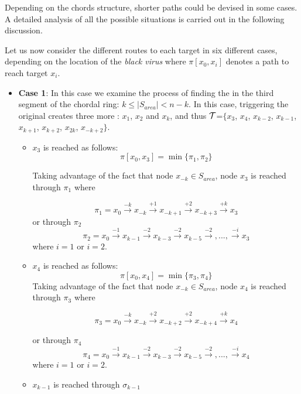  \noindent Depending on the chords structure,  shorter paths could be devised in some cases. A detailed analysis of all the possible situations is carried out in the following discussion.

Let us now consider the different routes to each target in six different cases, depending on the location of the {\it black virus} where $\pi[x_0,x_{i}] $ denotes a path to reach target $x_i$.
\begin{itemize}
\item {\bf Case 1}: In this case we examine the process of  finding the \bv in the third segment of the chordal ring: $k\leq |S_{area}| <n-k$. In this case, triggering the original \bv creates three more \bvs: $x_{1}$, $x_{2}$ and $x_{k}$, and thus $\cal T$=$\{ x_{3}$,  $x_{4}$, $x_{k-2}$, $x_{k-1}$, $x_{k+1}$, $x_{k+2}$, $x_{2k}$, $x_{-k+2}\}$. 
\begin{itemize}

\item  $x_{3}$  is reached as follows:
$$ \pi[x_0,x_{3}] = \min \{   \pi_{1}, \pi_{2}\}$$

Taking advantage of the fact that node $x_{-k}\in S_{area}$, node  $x_{3}$ is reached through $\pi_1$ where 
 
$$\pi_1 =  x_{0}\xrightarrow {-k}x_{-k} \xrightarrow {+1}x_{-k+1}\xrightarrow {+2}x_{-k+3}\xrightarrow {+k}x_{3}$$
or through $\pi_2$
$$\pi_2 =  x_{0}\xrightarrow {-1}x_{k-1} \xrightarrow {-2}x_{k-3}\xrightarrow {-2}x_{k-5}\xrightarrow {-2},...,\xrightarrow {-i} x_{3}$$
where $i=1$ or $i=2$.


\item  $x_{4}$  is reached as follows: 
$$ \pi[x_0,x_{4}] = \min \{   \pi_{3}, \pi_{4}\}$$
Taking advantage of the fact that node $x_{-k}\in S_{area}$, node  $x_{4}$ is reached through $\pi_3$ where 
 
$$\pi_3 =  x_{0}\xrightarrow {-k}x_{-k} \xrightarrow {+2}x_{-k+2}\xrightarrow {+2}x_{-k+4}\xrightarrow {+k}x_{4}$$

or through $\pi_4$
$$\pi_4 =  x_{0}\xrightarrow {-1}x_{k-1} \xrightarrow {-2}x_{k-3}\xrightarrow {-2}x_{k-5}\xrightarrow {-2},...,\xrightarrow {-i} x_{4}$$
where $i=1$ or $i=2$.



\item $x_{k-1}$ is reached through  $\sigma_{k-1}$ 
 

\end{itemize}
\end{itemize}
